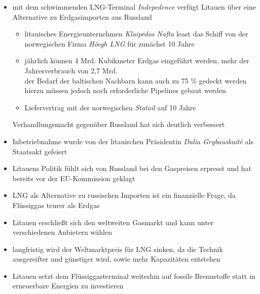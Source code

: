 \documentclass[11pt,a4paper]{article}
\begin{document}
\begin{itemize}

\item mit dem schwimmenden LNG-Terminal \textsl{Indepedence} verfügt Litauen über eine Alternative zu Erdgasimporten aus Russland

	\begin{itemize}
	
	\item litauisches Energieunternehmen \emph{Klaip\.{e}dos Nafta} least das Schiff von der norwegischen Firma \emph{Höegh LNG} für zunächst 10 Jahre
	
	\item jährlich können 4 Mrd. Kubikmeter Erdgas eingeführt werden, mehr der Jahresverbrauch von 2,7 Mrd.\\
	 der Bedarf der baltischen Nachbarn kann auch zu 75 \% gedeckt werden\\
	 hierzu müssen jedoch noch erforderliche Pipelines gebaut werden
	
	\item Liefervertrag mit der norwegischen \emph{Statoil} auf 10 Jahre

	\end{itemize}

 Verhandlungsmacht gegenüber Russland hat sich deutlich verbessert

\item Inbetriebnahme wurde von der litauischen Präsidentin \textsl{Dalia Grybauskait\.{e}} als Staatsakt gefeiert

\item Litauens Politik fühlt sich von Russland bei den Gaspreisen erpresst und hat bereits vor der EU-Kommission geklagt

\item LNG als Alternative zu russischen Importen ist ein finanzielle Frage, da Flüssiggas teurer als Erdgas

\item Litauen erschließt sich den weltweiten Gasmarkt und kann unter verschiedenen Anbietern wählen

\item langfristig wird der Weltmarktpreis für LNG sinken, da die Technik ausgereifter und günstiger wird, sowie mehr Kapazitäten entstehen

\item Litauen setzt dem Flüssiggasterminal weiterhin auf fossile Brennstoffe statt in erneuerbare Energien zu investieren



\end{itemize}
\end{document}
